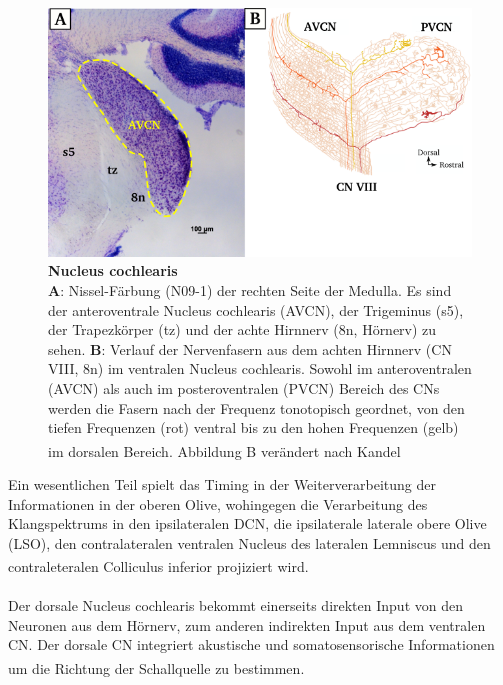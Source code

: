 \documentclass[12pt,a4paper,pdftex]{article}
\begin{document}
\begin{figure}[H]
    \centering
    \includegraphics[width = \textwidth]{pictures/auditory/CN.png}
    \caption[Nucleus cochlearis]{\textbf{Nucleus cochlearis}\\
    \textbf{A}: Nissel-Färbung (N09-1) der rechten Seite der Medulla. Es sind der anteroventrale Nucleus cochlearis (AVCN), der Trigeminus (s5), der Trapezkörper (tz) und der achte Hirnnerv (8n, Hörnerv) zu sehen. \textbf{B}: Verlauf der Nervenfasern aus dem achten Hirnnerv (CN VIII, 8n) im ventralen Nucleus cochlearis. Sowohl im anteroventralen (AVCN) als auch im posteroventralen (PVCN) Bereich des CNs werden die Fasern nach der Frequenz tonotopisch geordnet, von den tiefen Frequenzen (rot) ventral bis zu den hohen Frequenzen (gelb) im dorsalen Bereich. Abbildung B verändert nach Kandel \textsuperscript{\cite[31]{kandel2013principles}}}
    \label{fig:Nucleus_cochlearis}
\end{figure}

\newpage
Ein wesentlichen Teil spielt das Timing in der Weiterverarbeitung der Informationen in der oberen Olive, wohingegen die Verarbeitung des Klangspektrums in den ipsilateralen DCN, die ipsilaterale laterale obere Olive (LSO), den contralateralen ventralen Nucleus des lateralen Lemniscus und den contraleteralen Colliculus inferior projiziert wird\textsuperscript{\cite[31]{kandel2013principles}}. 
\\\\
\noindent Der dorsale Nucleus cochlearis bekommt einerseits direkten Input von den Neuronen aus dem Hörnerv, zum anderen indirekten Input aus dem ventralen CN. Der dorsale CN integriert akustische  und somatosensorische Informationen um die Richtung der Schallquelle zu bestimmen\textsuperscript{\cite[31]{kandel2013principles}}. 
\end{document}
